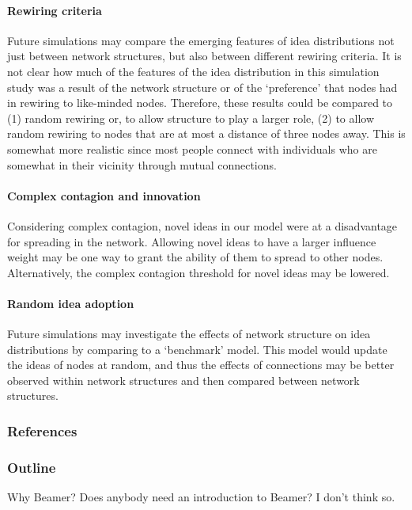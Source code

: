 \documentclass{beamer}
\begin{document}
\begin{frame}
\paragraph{Rewiring criteria}
Future simulations may compare the emerging features of idea distributions not just between network structures, but also between different rewiring criteria. It is not clear how much of the features of the idea distribution in this simulation study was a result of the network structure or of the `preference' that nodes had in rewiring to like-minded nodes. Therefore, these results could be compared to (1) random rewiring or, to allow structure to play a larger role, (2) to allow random rewiring to nodes that are at most a distance of three nodes away. This is somewhat more realistic since most people connect with individuals who are somewhat in their vicinity through mutual connections. 

\paragraph{Complex contagion and innovation}
Considering complex contagion, novel ideas in our model were at a disadvantage for spreading in the network. Allowing novel ideas to have a larger influence weight may be one way to grant the ability of them to spread to other nodes. Alternatively, the complex contagion threshold for novel ideas may be lowered.

\paragraph{Random idea adoption}
Future simulations may investigate the effects of network structure on idea distributions by comparing to a `benchmark' model. This model would update the ideas of nodes at random, and thus the effects of connections may be better observed within network structures and then compared between network structures.
\end{frame}
%
\begin{frame}
\frametitle{References}
\end{frame}
%
\begin{frame}
\frametitle{Outline}
\begin{block}
{Why Beamer?}
Does anybody need an introduction to Beamer?
I don't think so.
\end{block}
\end{frame}
 
\end{document}
